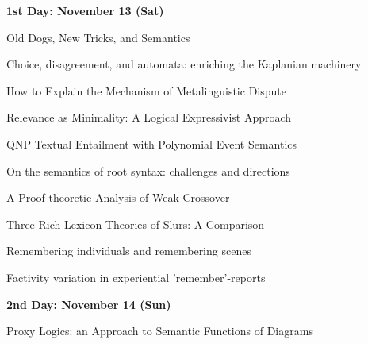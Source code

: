 \documentclass[12pt]{jarticle}
\begin{document}
\noindent\textbf{\large 
1st Day: November 13 (Sat)
}\\







  
      {Old Dogs, New Tricks, and Semantics}
      {}




  
      {Choice, disagreement, and automata: enriching the Kaplanian machinery}
      {}
  
      {How to Explain the Mechanism of Metalinguistic Dispute}
      {}
  
      {Relevance as Minimality: A Logical Expressivist Approach}
      {}




  
      {QNP Textual Entailment with Polynomial Event Semantics}
      {}
  
      {On the semantics of root syntax: challenges and directions}
      {}
  
      {A Proof-theoretic Analysis of Weak Crossover}
      {}




  
      {Three Rich-Lexicon Theories of Slurs: A Comparison}
      {}
  
      {Remembering individuals and remembering scenes}
      {}
  
      {Factivity variation in experiential 'remember'-reports}
      {}




\noindent\textbf{\large 
2nd Day: November 14 (Sun)
}\\



  
      {Proxy Logics: an Approach to Semantic Functions of Diagrams}
      {}



\end{document}
